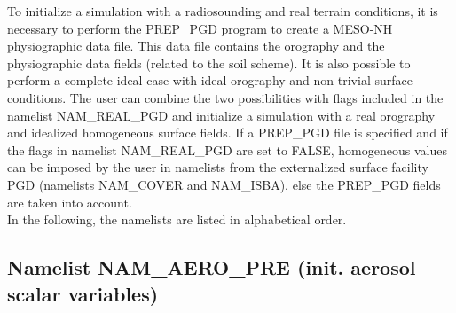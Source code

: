 To initialize a simulation with a radiosounding and real
terrain conditions, it is necessary to perform the PREP\_PGD program 
to create a MESO-NH physiographic data file. This data file contains
 the orography and the physiographic data fields (related to the soil scheme).
It is also possible to perform a complete ideal case with ideal orography and 
non trivial surface conditions.
The user can combine the two possibilities with flags included in the namelist 
NAM\_REAL\_PGD and initialize a simulation with a real orography and
idealized homogeneous surface fields.
If a PREP\_PGD file is specified and if the flags in namelist NAM\_REAL\_PGD
are set to FALSE, homogeneous values can be imposed by the user in namelists 
from the externalized surface facility PGD (namelists NAM\_COVER and NAM\_ISBA),
else the PREP\_PGD fields are taken into account.
\\

In the following, the namelists are listed in alphabetical order.
\newpage
\subsection{Namelist NAM\_AERO\_PRE (init. aerosol scalar variables)} \label{s:namaeropre}

